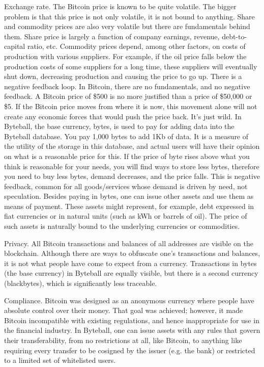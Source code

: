 \documentclass[a4paper, dvipdfmx]{jsarticle}
\begin{document}
Exchange rate. The Bitcoin price is known to be quite volatile. The bigger problem is that this price is not only volatile, it is not bound to anything. Share and commodity prices are also very volatile but there are fundamentals behind them. Share price is largely a function of company earnings, revenue, debt-to-capital ratio, etc. Commodity prices depend, among other factors, on costs of production with various suppliers. For example, if the oil price falls below the production costs of some suppliers for a long time, these suppliers will eventually shut down, decreasing production and causing the price to go up. There is a negative feedback loop. In Bitcoin, there are no fundamentals, and no negative feedback. A Bitcoin price of \$500 is no more justified than a price of \$50,000 or \$5. If the Bitcoin price moves from where it is now, this movement alone will not create any economic forces that would push the price back. It’s just wild. In Byteball, the base currency, bytes, is used to pay for adding data into the Byteball database. You pay 1,000 bytes to add 1Kb of data. It is a measure of the utility of the storage in this database, and actual users will have their opinion on what is a reasonable price for this. If the price of byte rises above what you think is reasonable for your needs, you will find ways to store less bytes, therefore you need to buy less bytes, demand decreases, and the price falls. This is negative feedback, common for all goods/services whose demand is driven by need, not speculation. Besides paying in bytes, one can issue other assets and use them as means of payment. These assets might represent, for example, debt expressed in fiat currencies or in natural units (such as kWh or barrels of oil). The price of such assets is naturally bound to the underlying currencies or commodities.

Privacy. All Bitcoin transactions and balances of all addresses are visible on the blockchain. Although there are ways to obfuscate one’s transactions and balances, it is not what people have come to expect from a currency. Transactions in bytes (the base currency) in Byteball are equally visible, but there is a second currency (blackbytes), which is significantly less traceable.

Compliance. Bitcoin was designed as an anonymous currency where people have absolute control over their money. That goal was achieved; however, it made Bitcoin incompatible with existing regulations, and hence inappropriate for use in the financial industry. In Byteball, one can issue assets with any rules that govern their transferability, from no restrictions at all, like Bitcoin, to anything like requiring every transfer to be cosigned by the issuer (e.g. the bank) or restricted to a limited set of whitelisted users.
\end{document}
